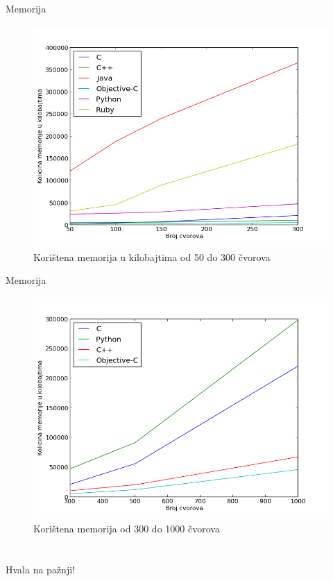 \documentclass[utf8]{beamer}
\begin{document}
\begin{frame}{Memorija}

\begin{figure}[!h]
\centering
\includegraphics[scale=0.45]{../Dokumentacija/img/memorija_300.png}
\caption{Korištena memorija u kilobajtima od 50 do 300 čvorova}
\label{fig:memorija_300}
\end{figure}

\end{frame}

\begin{frame}{Memorija}

\begin{figure}[!h]
\centering
\includegraphics[scale=0.45]{../Dokumentacija/img/memorija_1000.png}
\caption{Korištena memorija od 300 do 1000 čvorova}
\label{fig:memorija_1000}
\end{figure}
\end{frame}


\section*{}
\begin{frame}{}
\huge{Hvala na pažnji!}
\end{frame}
\end{document}
